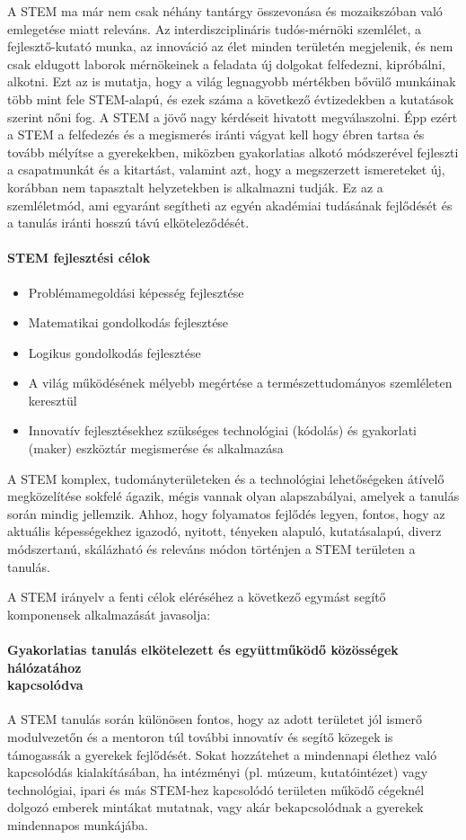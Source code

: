 A STEM ma már nem csak néhány tantárgy összevonása és  mozaikszóban való emlegetése miatt releváns. Az interdiszciplináris tudós-mér\-nö\-ki szemlélet, a fejlesztő-kutató munka, az innováció az élet minden területén megjelenik, és nem csak eldugott laborok mérnökeinek a feladata új dolgokat felfedezni, kipróbálni, alkotni. Ezt az is mutatja, hogy a világ legnagyobb mértékben bővülő munkáinak több mint fele STEM-alapú, és ezek száma a következő évtizedekben a kutatások szerint nőni fog. A STEM a jövő nagy kérdéseit hivatott megválaszolni. Épp ezért a STEM a felfedezés és a megismerés iránti vágyat kell hogy ébren tartsa és tovább mélyítse a gyerekekben, miközben gyakorlatias alkotó módszerével fejleszti a csapatmunkát és a kitartást, valamint azt, hogy a megszerzett ismereteket új, korábban nem tapasztalt helyzetekben is alkalmazni tudják. Ez az a szemléletmód, ami egyaránt segítheti az egyén akadémiai tudásának fejlődését és a tanulás iránti hosszú távú elköteleződését.

\paragraph{STEM fejlesztési célok}
\begin{itemize}
  \item Problémamegoldási képesség fejlesztése
  \item  Matematikai gondolkodás fejlesztése
  \item  Logikus gondolkodás fejlesztése
  \item  A világ működésének mélyebb megértése a természettudományos szemléleten keresztül
  \item  Innovatív fejlesztésekhez szükséges technológiai (kódolás) és gyakorlati (maker) eszköztár megismerése és alkalmazása
\end{itemize}

A STEM komplex, tudományterületeken és a technológiai lehetőségeken átívelő megközelítése sokfelé ágazik, mégis vannak olyan alapszabályai, amelyek a tanulás során mindig jellemzik. Ahhoz, hogy folyamatos fejlődés legyen, fontos, hogy az aktuális képességekhez igazodó, nyitott, tényeken alapuló, kutatásalapú, diverz módszertanú, skálázható és releváns módon történjen a STEM területen a tanulás.

A STEM irányelv a fenti célok eléréséhez a következő egymást segítő komponensek alkalmazását javasolja:

\paragraph{Gyakorlatias tanulás elkötelezett és együttműködő
  közösségek hálózatához\\
  kapcsolódva}
A STEM tanulás során különösen fontos, hogy az adott területet jól ismerő modulvezetőn és a mentoron túl további innovatív és segítő közegek is támogassák a gyerekek fejlődését. Sokat hozzátehet a mindennapi élethez való kapcsolódás kialakításában, ha intézményi (pl. múzeum, kutatóintézet) vagy technológiai, ipari és más STEM-hez kapcsolódó területen működő cégeknél dolgozó emberek mintákat mutatnak, vagy akár bekapcsolódnak a gyerekek mindennapos munkájába.

